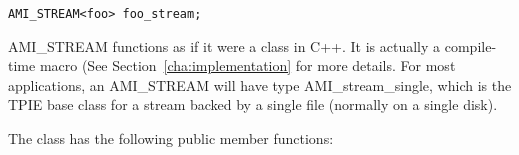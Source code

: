 \begin{verbatim}
AMI_STREAM<foo> foo_stream;
\end{verbatim}

AMI\_STREAM functions as if it were a class in C++. It is
actually a compile-time macro (See
Section~\ref{cha:implementation} for more details. For most
applications, an AMI\_STREAM will have type
AMI\_stream\_single, which is the TPIE base class for a stream
backed by a single file (normally on a single disk).

The  class has the following public
member functions: 


